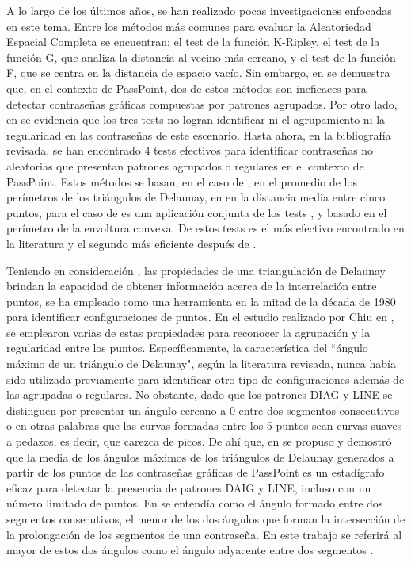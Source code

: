 \documentclass[12pt]{report}
\begin{document}
	A lo largo de los últimos años, se han realizado pocas investigaciones enfocadas en este tema. Entre los métodos más comunes para evaluar la Aleatoriedad Espacial Completa se encuentran: el test de la función K-Ripley, el test de la función G, que analiza la distancia al vecino más cercano, y el test de la función F, que se centra en la distancia de espacio vacío. Sin embargo, en \cite{6,7} se demuestra que, en el contexto de PassPoint, dos de estos métodos son ineficaces para detectar contraseñas gráficas compuestas por patrones agrupados. Por otro lado, en \cite{7,8} se evidencia que los tres tests no logran identificar ni el agrupamiento ni la regularidad en las contraseñas de este escenario. Hasta ahora, en la bibliografía revisada, se han encontrado 4 tests efectivos \cite{7,9,10,11} para identificar contraseñas no aleatorias que presentan patrones agrupados o regulares en el contexto de PassPoint. Estos métodos se basan, en el caso de \cite{9}, en el promedio de los perímetros de los triángulos de Delaunay, en  \cite{7} en la distancia media entre cinco puntos, para el caso de \cite{10} es una aplicación conjunta de los tests \cite{7,9}, y \cite{11} basado en  el perímetro de la envoltura convexa. De estos tests \cite{11} es el más efectivo encontrado en la literatura y el segundo más eficiente después de \cite{7}.
	
	Teniendo en consideración \cite{12}, las propiedades de una triangulación de Delaunay brindan la capacidad de obtener información acerca de la interrelación entre puntos, se ha empleado como una herramienta en la mitad de la década de 1980 para identificar configuraciones de puntos. En el estudio realizado por Chiu en \cite{12}, se emplearon varias de estas propiedades para reconocer la agrupación y la regularidad entre los puntos. Específicamente, la característica del ``ángulo máximo de un triángulo de Delaunay", según la literatura revisada, nunca había sido utilizada previamente para identificar otro tipo de configuraciones además de las agrupadas o regulares. No obstante, dado que los patrones DIAG y LINE se distinguen por presentar un ángulo cercano a 0{\degree } entre dos segmentos consecutivos o en otras palabras que las curvas formadas entre los 5 puntos sean curvas suaves a pedazos, es decir, que carezca de picos.  De ahí que, en \cite{13} se propuso y demostró que la media de los ángulos máximos de los triángulos de Delaunay generados a partir de los puntos de las contraseñas gráficas de PassPoint es un estadígrafo eficaz para detectar la presencia de patrones DAIG y LINE, incluso con un número limitado de puntos. En \cite{5} se entendía como el ángulo formado entre dos segmentos consecutivos, el menor de los dos ángulos que forman la intersección de la prolongación de los segmentos de una contraseña. En este trabajo se referirá al mayor de estos dos ángulos como el ángulo adyacente entre dos segmentos .
\end{document}
